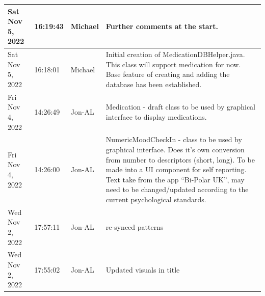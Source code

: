 \documentclass[11pt]{article}
\begin{document}
\begin{center}
\begin{longtable}{|p{2.7cm}|l|p{2cm}|p{8cm}|}
           \hline Sat Nov 5, 2022                            & 16:19:43                           & Michael                                 & Further comments at the start.                                                                                                                                                                                                                                                                             \\
           \hline Sat Nov 5, 2022                            & 16:18:01                           & Michael                                 & Initial creation of MedicationDBHelper.java. This class will support medication for now. Base feature of creating and adding the database has been established.                                                                                                                                            \\
           \hline Fri Nov 4, 2022                            & 14:26:49                           & Jon-AL                                  & Medication - draft class to be used by graphical interface to display medications.                                                                                                                                                                                                                         \\
           \hline Fri Nov 4, 2022                            & 14:26:00                           & Jon-AL                                  & NumericMoodCheckIn - class to be used by graphical interface. Does it's own conversion from number to descriptors (short, long). To be made into a UI component for self reporting. Text take from the app ``Bi-Polar UK'', may need to be changed/updated according to the current psychological standards. \\
           \hline Wed Nov 2, 2022                            & 17:57:11                           & Jon-AL                                  & re-synced patterns                                                                                                                                                                                                                                                                                         \\
           \hline Wed Nov 2, 2022                            & 17:55:02                           & Jon-AL                                  & Updated visuals in title                                                                                                                                                                                                                                                                                   \\

\end{longtable}
\end{center}
\end{document}
